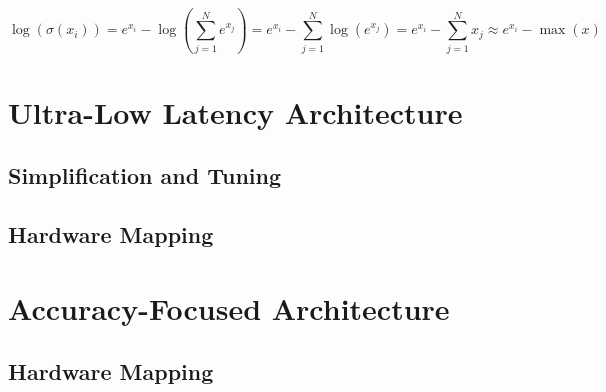 \begin{equation} \label{eq:log-softmax-max}
    \log (\sigma (x_i)) = e^{x_i} - \log(\sum_{j=1}^{N} e^{x_j}) = e^{x_i} - \sum_{j=1}^{N} \log(e^{x_j}) = e^{x_i} - \sum_{j=1}^{N} x_j \approx e^{x_i} - \max(x)
\end{equation}


\section{Ultra-Low Latency Architecture}

\subsection{Simplification and Tuning}

\subsection{Hardware Mapping}


\section{Accuracy-Focused Architecture}

\subsection{Hardware Mapping}

